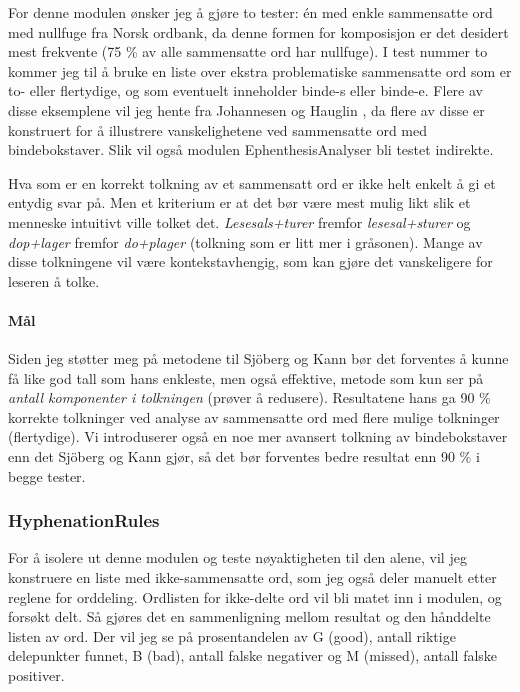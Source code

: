 For denne modulen ønsker jeg å gjøre to tester: én med enkle sammensatte ord med nullfuge fra Norsk ordbank, da denne formen for komposisjon er det desidert mest frekvente (75 \% av alle sammensatte ord har nullfuge\cite{johannessen1996automatic}). I test nummer to kommer jeg til å bruke en liste over ekstra problematiske sammensatte ord som er to- eller flertydige, og som eventuelt inneholder binde-s eller binde-e. Flere av disse eksemplene vil jeg hente fra Johannesen og Hauglin \cite{johannessen1996automatic}, da flere av disse er konstruert for å illustrere vanskelighetene ved sammensatte ord med bindebokstaver. Slik vil også modulen EphenthesisAnalyser bli testet indirekte.

Hva som er en korrekt tolkning av et sammensatt ord er ikke helt enkelt å gi et entydig svar på. Men et kriterium er at det bør være mest mulig likt slik et menneske intuitivt ville tolket det. \textit{Lesesals+turer} fremfor \textit{lesesal+sturer} og \textit{dop+lager} fremfor \textit{do+plager} (tolkning som er litt mer i gråsonen). Mange av disse tolkningene vil være kontekstavhengig, som kan gjøre det vanskeligere for leseren å tolke.

\paragraph{Mål} Siden jeg støtter meg på metodene til Sjöberg og Kann \cite{sjobergh2004finding} bør det forventes å kunne få like god tall som hans enkleste, men også effektive, metode som kun ser på \textit{antall komponenter i tolkningen} (prøver å redusere). Resultatene hans ga 90 \% korrekte tolkninger ved analyse av sammensatte ord med flere mulige tolkninger (flertydige). Vi introduserer også en noe mer avansert tolkning av bindebokstaver enn det Sjöberg og Kann gjør, så det bør forventes bedre resultat enn 90 \% i begge tester.

\subsubsection{HyphenationRules}

For å isolere ut denne modulen og teste nøyaktigheten til den alene, vil jeg konstruere en liste med ikke-sammensatte ord, som jeg også deler manuelt etter reglene for orddeling. Ordlisten for ikke-delte ord vil bli matet inn i modulen, og forsøkt delt. Så gjøres det en sammenligning mellom resultat og den hånddelte listen av ord. Der vil jeg se på prosentandelen av G (good), antall riktige delepunkter funnet, B (bad), antall falske negativer og M (missed), antall falske positiver.

